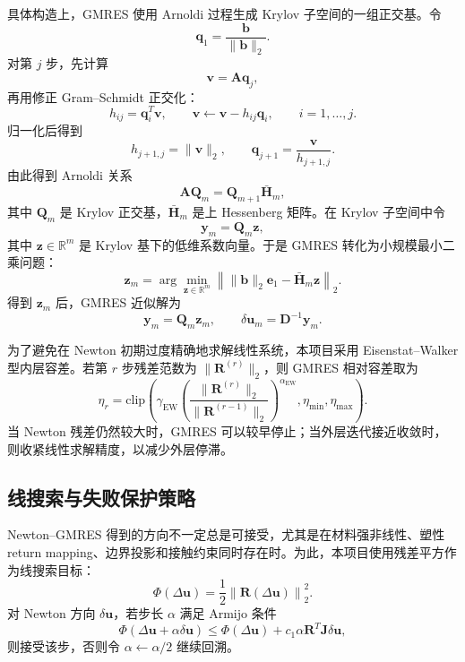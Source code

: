 \documentclass[a4paper]{article}
\begin{document}
具体构造上，GMRES 使用 Arnoldi 过程生成 Krylov 子空间的一组正交基。令
\[
    \bm{q}_1
    =
    \frac{\bm{b}}{\|\bm{b}\|_2}.
\]
对第 $j$ 步，先计算
\[
    \bm{v}
    =
    \bm{A}\bm{q}_j,
\]
再用修正 Gram--Schmidt 正交化：
\[
    h_{ij}
    =
    \bm{q}_i^T\bm{v},
    \qquad
    \bm{v}
    \leftarrow
    \bm{v}
    -
    h_{ij}\bm{q}_i,
    \qquad
    i=1,\ldots,j.
\]
归一化后得到
\[
    h_{j+1,j}
    =
    \|\bm{v}\|_2,
    \qquad
    \bm{q}_{j+1}
    =
    \frac{\bm{v}}{h_{j+1,j}}.
\]
由此得到 Arnoldi 关系
\[
    \bm{A}\bm{Q}_m
    =
    \bm{Q}_{m+1}\bar{\bm{H}}_m,
\]
其中 $\bm{Q}_m$ 是 Krylov 正交基，$\bar{\bm{H}}_m$ 是上 Hessenberg 矩阵。在 Krylov 子空间中令
\[
    \bm{y}_m
    =
    \bm{Q}_m\bm{z},
\]
其中 $\bm{z}\in\mathbb{R}^m$ 是 Krylov 基下的低维系数向量。于是 GMRES 转化为小规模最小二乘问题：
\[
    \bm{z}_m
    =
    \arg\min_{\bm{z}\in\mathbb{R}^m}
    \left\|
        \|\bm{b}\|_2\bm{e}_1
        -
        \bar{\bm{H}}_m\bm{z}
    \right\|_2.
\]
得到 $\bm{z}_m$ 后，GMRES 近似解为
\[
    \bm{y}_m
    =
    \bm{Q}_m\bm{z}_m,
    \qquad
    \delta\bm{u}_m
    =
    \bm{D}^{-1}\bm{y}_m.
\]

为了避免在 Newton 初期过度精确地求解线性系统，本项目采用 Eisenstat--Walker 型内层容差。若第 $r$ 步残差范数为 $\|\bm{R}^{(r)}\|_2$，则 GMRES 相对容差取为
\[
    \eta_r
    =
    \mathrm{clip}
    \left(
        \gamma_{\mathrm{EW}}
        \left(
            \frac{
                \|\bm{R}^{(r)}\|_2
            }{
                \|\bm{R}^{(r-1)}\|_2
            }
        \right)^{\alpha_{\mathrm{EW}}},
        \eta_{\min},
        \eta_{\max}
    \right).
\]
当 Newton 残差仍然较大时，GMRES 可以较早停止；当外层迭代接近收敛时，则收紧线性求解精度，以减少外层停滞。
\subsection{线搜索与失败保护策略}

Newton--GMRES 得到的方向不一定总是可接受，尤其是在材料强非线性、塑性 return mapping、边界投影和接触约束同时存在时。为此，本项目使用残差平方作为线搜索目标：
\[
    \Phi
    \left(
        \Delta\bm{u}
    \right)
    =
    \frac{1}{2}
    \left\|
        \bm{R}
        \left(
            \Delta\bm{u}
        \right)
    \right\|_2^2.
\]
对 Newton 方向 $\delta\bm{u}$，若步长 $\alpha$ 满足 Armijo 条件
\[
    \Phi
    \left(
        \Delta\bm{u}
        +
        \alpha\delta\bm{u}
    \right)
    \leq
    \Phi
    \left(
        \Delta\bm{u}
    \right)
    +
    c_1\alpha
    \bm{R}^T
    \bm{J}\delta\bm{u},
\]
则接受该步，否则令 $\alpha\leftarrow \alpha/2$ 继续回溯。
\end{document}
